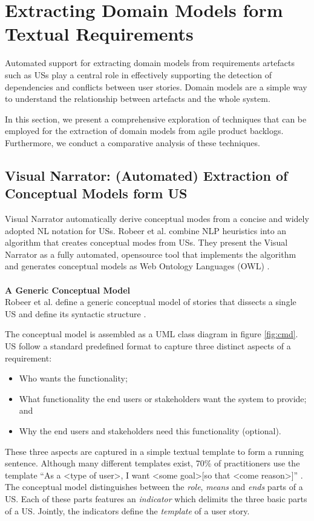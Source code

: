 \section{Extracting Domain Models form Textual Requirements}\label{dmodel}
Automated support for extracting domain models from requirements artefacts such as USs play a central role in effectively supporting the detection of dependencies and conflicts between user stories. Domain models are a simple way to understand the relationship between artefacts and the whole system. 

In this section, we present a comprehensive exploration of techniques that can be employed for the extraction of domain models from agile product backlogs. Furthermore, we conduct a comparative analysis of these techniques. 
\subsection{Visual Narrator: (Automated) Extraction of Conceptual Models form US} \label{vnarrator}
Visual Narrator automatically derive conceptual modes from a concise and widely adopted NL notation for USs. Robeer et al. combine NLP heuristics into an algorithm that creates conceptual modes from USs. They present the Visual Narrator as a fully automated, opensource tool that implements the algorithm and generates conceptual models as Web Ontology Languages (OWL) \cite{Robeer2016}.\\ \\ 
\textbf{A Generic Conceptual Model}\\
Robeer et al. define a generic conceptual model of stories that dissects a single US and define its syntactic structure \cite{Lucassen2015}. 

The conceptual model is assembled as a UML class diagram in figure \ref{fig:cmd}. US follow a standard predeﬁned format \cite{Wautelet2014} to capture three distinct aspects of a requirement:
\begin{itemize}
\item Who wants the functionality;
\item What functionality the end users or stakeholders want the system to provide; and 
\item Why the end users and stakeholders need this functionality (optional).
\end{itemize}
These three aspects are captured in a simple textual template to form a running sentence. Although many different templates exist, 70\% of practitioners use the template \enquote{As a \textless type of user\textgreater, I want \textless some goal\textgreater [so that \textless come reason\textgreater ]} \cite{Greer2004}. 
The conceptual model distinguishes between the \emph{role}, \emph{means} and \emph{ends} parts of a US. Each of these parts features an \emph{indicator} which delimits the three basic parts of a US. Jointly, the indicators deﬁne the \emph{template} of a user story.

